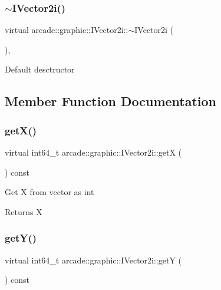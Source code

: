 \subsubsection{\texorpdfstring{$\sim$IVector2i()}{~IVector2i()}}
{\footnotesize\ttfamily virtual arcade\+::graphic\+::\+I\+Vector2i\+::$\sim$\+I\+Vector2i (\begin{DoxyParamCaption}{ }\end{DoxyParamCaption})\hspace{0.3cm}{\ttfamily [virtual]}, {\ttfamily [default]}}

Default desctructor 

\subsection{Member Function Documentation}
\mbox{\label{classarcade_1_1graphic_1_1_i_vector2i_a63a56c6cc94bfa2269f1f863207c3407}} 
\subsubsection{\texorpdfstring{getX()}{getX()}}
{\footnotesize\ttfamily virtual int64\+\_\+t arcade\+::graphic\+::\+I\+Vector2i\+::getX (\begin{DoxyParamCaption}{ }\end{DoxyParamCaption}) const\hspace{0.3cm}{\ttfamily [pure virtual]}}

Get X from vector as int \begin{DoxyReturn}{Returns}
X 
\end{DoxyReturn}
\mbox{\label{classarcade_1_1graphic_1_1_i_vector2i_a015a561871d04bf7ec5e1f900d56015e}} 
\subsubsection{\texorpdfstring{getY()}{getY()}}
{\footnotesize\ttfamily virtual int64\+\_\+t arcade\+::graphic\+::\+I\+Vector2i\+::getY (\begin{DoxyParamCaption}{ }\end{DoxyParamCaption}) const\hspace{0.3cm}{\ttfamily [pure virtual]}}

